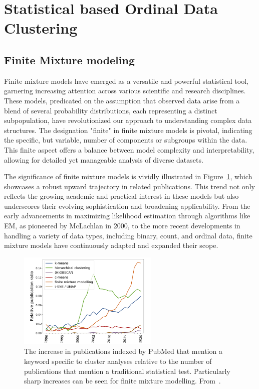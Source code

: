 \documentclass{article}
\begin{document}
\section{Statistical based Ordinal Data Clustering}

\subsection{Finite Mixture modeling}

Finite mixture models have emerged as a versatile and powerful statistical tool, garnering increasing attention across various scientific and research disciplines. These models, predicated on the assumption that observed data arise from a blend of several probability distributions, each representing a distinct subpopulation, have revolutionized our approach to understanding complex data structures. The designation "finite" in finite mixture models is pivotal, indicating the specific, but variable, number of components or subgroups within the data. This finite aspect offers a balance between model complexity and interpretability, allowing for detailed yet manageable analysis of diverse datasets.

The significance of finite mixture models is vividly illustrated in Figure~\ref{fig:trend}, which showcases a robust upward trajectory in related publications. This trend not only reflects the growing academic and practical interest in these models but also underscores their evolving sophistication and broadening applicability. From the early advancements in maximizing likelihood estimation through algorithms like EM, as pioneered by McLachlan in 2000, to the more recent developments in handling a variety of data types, including binary, count, and ordinal data, finite mixture models have continuously adapted and expanded their scope.

\begin{figure}[ht!] %
    \centering %
    \includegraphics[width=0.6\textwidth]{images/trend.png} %
    \caption{The increase in publications indexed by PubMed that mention a keyword specific to cluster analyses relative to the number of publications 
    that mention a traditional statistical test. 
    Particularly sharp increases can be seen for finite mixture modelling.
    From~\cite{dalmaijer2022statistical}.} %
    \label{fig:trend} %
  \end{figure}
\end{document}
